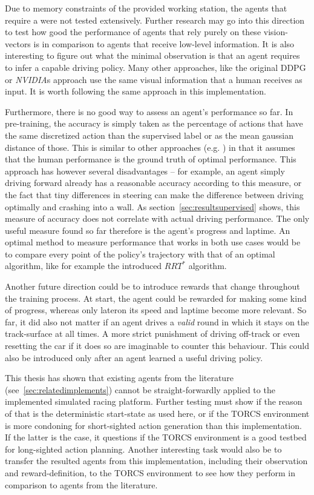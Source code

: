 Due to memory constraints of the provided working station, the agents that require a  were not tested extensively. Further research may go into this direction to test how good the performance of agents that rely purely on these vision-vectors is in comparison to agents that receive low-level information. It is also interesting to figure out what the minimal observation is that an agent requires to infer a capable driving policy. Many other approaches, like the original DDPG \cite{lillicrap_continuous_2015} or \textit{NVIDIA}s approach \cite{bojarski_end_2016} use the same visual information that a human receives as input. It is worth following the same approach in this implementation.

Furthermore, there is no good way to assess an agent's performance so far. In pre-training, the accuracy is simply taken as the percentage of actions that have the same discretized action than the supervised label or as the mean gaussian distance of those. This is similar to other approaches (e.g. \cite{bojarski_end_2016}) in that it assumes that the human performance is the ground truth of optimal performance. This approach has however several disadvantages -- for example, an agent simply driving forward already has a reasonable accuracy according to this measure, or the fact that tiny differences in steering can make the difference between driving optimally and crashing into a wall. As section~\ref{sec:resultsupervised} shows, this measure of accuracy does not correlate with actual driving performance. The only useful measure found so far therefore is the agent's progress and laptime. An optimal method to measure performance that works in both use cases would be to compare every point of the policy's trajectory with that of an optimal algorithm, like for example the introduced $RRT^*$ algorithm.

Another future direction could be to introduce rewards that change throughout the training process. At start, the agent could be rewarded for making some kind of progress, whereas only lateron its speed and laptime become more relevant. So far, it did also not matter if an agent drives a \textit{valid} round in which it stays on the track-surface at all times. A more strict punishment of driving off-track or even resetting the car if it does so are imaginable to counter this behaviour. This could also be introduced only after an agent learned a useful driving policy.

This thesis has shown that existing agents from the literature (see~\ref{sec:relatedimplements}) cannot be straight-forwardly applied to the implemented simulated racing platform. Further testing must show if the reason of that is the deterministic start-state as used here, or if the TORCS environment is more condoning for short-sighted action generation than this implementation. If the latter is the case, it questions if the TORCS environment is a good testbed for long-sighted action planning. Another interesting task would also be to transfer the resulted agents from this implementation, including their observation and reward-definition, to the TORCS environment to see how they perform in comparison to agents from the literature. 

